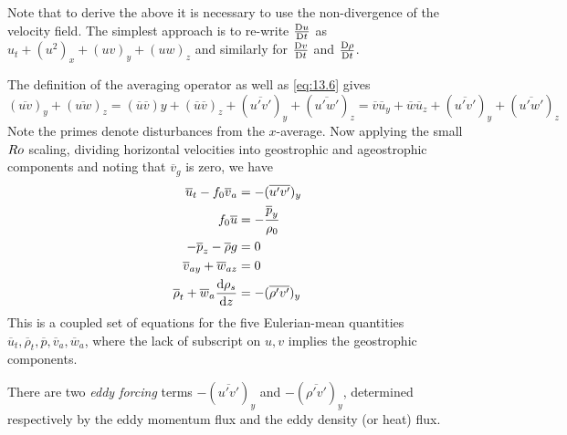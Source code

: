\documentclass{jknotes}
\begin{document}
Note that to derive the above it is necessary to use the non-divergence of the
velocity field. The simplest approach is to re-write $\frac{\mathrm{D} u}{\mathrm{D}
	t}$ as $u_t + (u^2)_x + (uv)_y + (uw)_z$ and similarly for $\frac{\mathrm{D}
v}{\mathrm{D} t}$ and $\frac{\mathrm{D} \rho}{\mathrm{D} t}$. 

The definition of the averaging operator as well as \eqref{eq:13.6} gives
\begin{equation}
	(\overline{uv})_y + (\overline{uw})_z = (\overline{u}\overline{v})y +
	(\overline{u}\overline{v})_z + (\overline{u'v'})_y + (\overline{u'w'})_z =
	\overline{v}\overline{u}_y + \overline{w}\overline{u}_z +
	(\overline{u'v'})_y + (\overline{u'w'})_z
\end{equation}
Note the primes denote disturbances from the $x$-average. Now applying the
small $Ro$ scaling, dividing horizontal velocities into geostrophic and
ageostrophic components and noting that $\overline{v}_g$ is zero, we have
\begin{align}
	\overline{u}_t - f_0 \overline{v}_a &= -(\overline{u'v'})_y \\
	f_0 \overline{u} &= -\frac{\overline{p}_y}{\rho_0} \label{eq:13.9}\\
	-\overline{p}_z - \overline{\rho}g &= 0 \label{eq:13.10}\\
	\overline{v}_{ay} + \overline{w}_{az} &= 0 \\
	\overline{\rho}_t + \overline{w}_a \frac{\diffd \rho_s}{\diffd z} &=
	-(\overline{\rho' v'})_y
\end{align}
This is a coupled set of equations for the five Eulerian-mean quantities
$\overline{u}_t, \overline{\rho}_t, \overline{p}, \overline{v}_a,
\overline{w}_a$, where the lack of subscript on $u, v$ implies the geostrophic
components.

There are two \emph{eddy forcing} terms $-(\overline{u'v'})_y$ and
$-(\overline{\rho'v'})_y$, determined respectively by the eddy momentum flux
and the eddy density (or heat) flux. 
\end{document}
